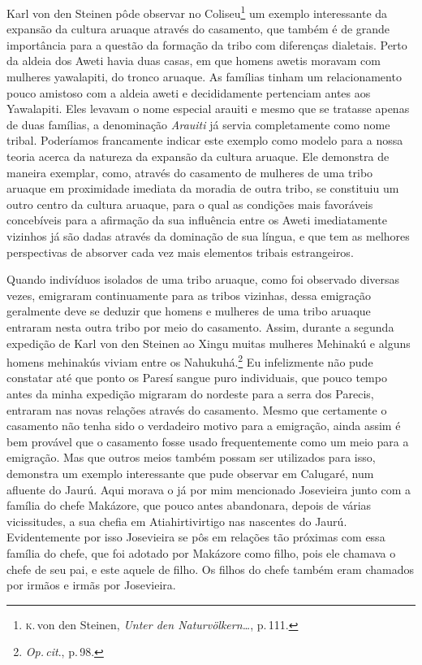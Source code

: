 Karl von den Steinen pôde observar no Coliseu\footnote{\textsc{k}.\,von den
  Steinen, \textit{Unter den Naturvölkern\ldots}, p.\,111.} um
exemplo interessante da expansão da cultura aruaque através do
casamento, que também é de grande importância para a questão da formação
da tribo com diferenças dialetais. Perto da aldeia dos Aweti havia duas
casas, em que homens awetis moravam com mulheres yawalapiti, do tronco
aruaque. As famílias tinham um relacionamento pouco amistoso com a
aldeia aweti e decididamente pertenciam antes aos Yawalapiti. Eles
levavam o nome especial arauiti e mesmo que se tratasse apenas de duas
famílias, a denominação \textit{Arauiti} já servia completamente como nome
tribal. Poderíamos francamente indicar este exemplo como modelo para a
nossa teoria acerca da natureza da expansão da cultura aruaque. Ele
demonstra de maneira exemplar, como, através do casamento de mulheres de
uma tribo aruaque em proximidade imediata da moradia de outra tribo, se
constituiu um outro centro da cultura aruaque, para o qual as condições
mais favoráveis concebíveis para a afirmação da sua influência entre os Aweti 
imediatamente vizinhos já são dadas através da dominação
de sua língua, e que tem as melhores perspectivas de absorver cada vez
mais elementos tribais estrangeiros.

Quando indivíduos isolados de uma tribo aruaque, como foi observado
diversas vezes, emigraram continuamente para as tribos vizinhas, dessa
emigração geralmente deve se deduzir que homens e mulheres de uma tribo
aruaque entraram nesta outra tribo por meio do casamento. Assim, durante
a segunda expedição de Karl von den Steinen ao Xingu muitas mulheres
Mehinakú e alguns homens mehinakús viviam entre os Nahukuhá.\footnote{\textit{Op.\,cit}., p.\,98.} Eu infelizmente não pude constatar até que ponto os
Paresí sangue puro individuais, que pouco tempo antes da minha expedição
migraram do nordeste para a serra dos Parecis, entraram nas novas
relações através do casamento. Mesmo que certamente o casamento não
tenha sido o verdadeiro motivo para a emigração, ainda assim é bem
provável que o casamento fosse usado frequentemente como um meio para a
emigração. Mas que outros meios também possam ser utilizados para isso,
demonstra um exemplo interessante que pude observar em Calugaré, num
afluente do Jaurú. Aqui morava o já por mim mencionado Josevieira junto
com a família do chefe Makázore, que pouco antes abandonara, depois de
várias vicissitudes, a sua chefia em Atiahirtivirtigo nas nascentes do
Jaurú. Evidentemente por isso Josevieira se pôs em relações tão
próximas com essa família do chefe, que foi adotado por Makázore como
filho, pois ele chamava o chefe de seu pai, e este aquele de filho. Os
filhos do chefe também eram chamados por irmãos e irmãs por Josevieira.

